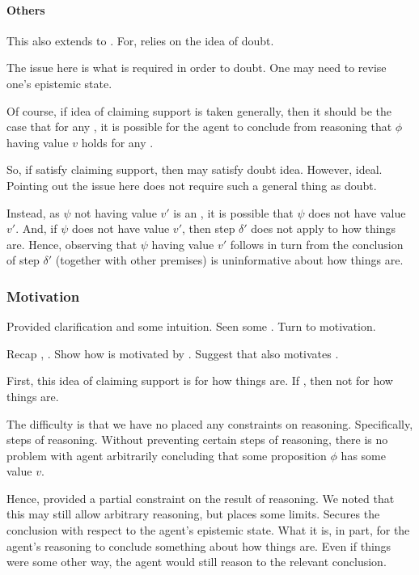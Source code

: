 \paragraph{Others}

\begin{note}
  This also extends to \citeauthor{Wright:2011wn}.
  For, \citeauthor{Wright:2011wn} relies on the idea of doubt.

  The issue here is what is required in order to doubt.
  One may need to revise one's epistemic state.

  Of course, if idea of claiming support is taken generally, then it should be the case that for any \epPW{}, it is possible for the agent to conclude from reasoning that \(\phi\) having value \(v\) holds for any \epVAd{} \world{}.

  So, if satisfy claiming support, then may satisfy doubt idea.
  However, ideal.
  Pointing out the issue here does not require such a general thing as doubt.
\end{note}

\begin{note}
  Instead, as \(\psi\) not having value \(v'\) is an \ep{}, it is possible that \(\psi\) does not have value \(v'\).
  And, if \(\psi\) does not have value \(v'\), then step \(\delta'\) does not apply to how things are.
  Hence, observing that \(\psi\) having value \(v'\) follows in turn from the conclusion of step \(\delta'\) (together with other premises) is uninformative about how things are.
\end{note}

\subsubsection{Motivation}
\label{sec:motivation}

\begin{note}
  Provided clarification and some intuition.
  Seen some .
  Turn to motivation.

  Recap \ideaS{}, \support{}.
  Show how \ideaCS{} is motivated by \ideaS{}.
  Suggest that \ideaCS{} also motivates \ideaS{}.
\end{note}

\begin{note}
  First, this idea of claiming support is for how things are.
  If \epVW{}, then not for how things are.

  The difficulty is that we have no placed any constraints on reasoning.
  Specifically, steps of reasoning.
  Without preventing certain steps of reasoning, there is no problem with agent arbitrarily concluding that some proposition \(\phi\) has some value \(v\).

  Hence, \ideaS{} provided a partial constraint on the result of reasoning.
  We noted that this may still allow arbitrary reasoning, but \ideaS{} places some limits.
  Secures the conclusion with respect to the agent's epistemic state.
  What it is, in part, for the agent's reasoning to conclude something about how things are.
  Even if things were some other way, the agent would still reason to the relevant conclusion.
\end{note}

